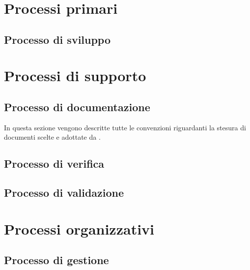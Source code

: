 \newcommand{\documenttitle}{Norme di Progetto}
\newcommand{\addressedto}{\committente \\ & \committenteAlt}
\newcommand{\editorialstaff}{\sm}
\newcommand{\teststaff}{\ao}
\newcommand{\approvalstaff}{\dm}
\newcommand{\use}{Interno}





\tableofcontents %
\listoffigures
\pagebreak

\section{Processi primari}
\subsection{Processo di sviluppo}



\section{Processi di supporto}
\subsection{Processo di documentazione}
In questa sezione vengono descritte tutte le convenzioni riguardanti la stesura di documenti scelte e adottate da \gruppo.



\subsection{Processo di verifica}



\subsection{Processo di validazione}
\label{processoValidazione}


\section{Processi organizzativi}
\subsection{Processo di gestione}




\appendix
\begin{appendices}


\end{appendices}


